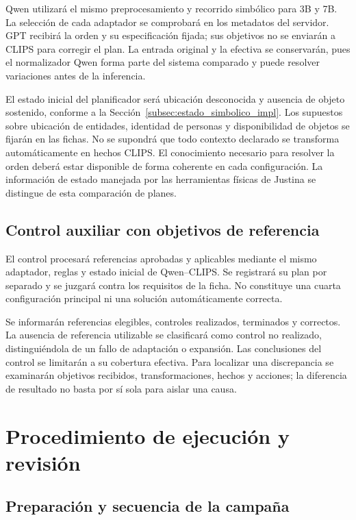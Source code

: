 Qwen utilizará el mismo preprocesamiento y recorrido simbólico para 3B
y 7B. La selección de cada adaptador se comprobará en los metadatos del
servidor. GPT recibirá la orden y su especificación fijada; sus objetivos
no se enviarán a CLIPS para corregir el plan. La entrada original y la
efectiva se conservarán, pues el normalizador Qwen forma parte del
sistema comparado y puede resolver variaciones antes de la inferencia.

El estado inicial del planificador será ubicación desconocida y ausencia
de objeto sostenido, conforme a la
Sección~\ref{subsec:estado_simbolico_impl}. Los supuestos sobre ubicación
de entidades, identidad de personas y disponibilidad de objetos se fijarán
en las fichas. No se supondrá que todo contexto declarado se transforma
automáticamente en hechos CLIPS. El conocimiento necesario para resolver
la orden deberá estar disponible de forma coherente en cada configuración.
La información de estado manejada por las herramientas físicas de Justina
se distingue de esta comparación de planes.

\subsection{Control auxiliar con objetivos de referencia}

El control procesará referencias aprobadas y aplicables mediante el mismo
adaptador, reglas y estado inicial de Qwen--CLIPS. Se registrará su plan
por separado y se juzgará contra los requisitos de la ficha. No constituye
una cuarta configuración principal ni una solución automáticamente correcta.

Se informarán referencias elegibles, controles realizados, terminados y
correctos. La ausencia de referencia utilizable se clasificará como control
no realizado, distinguiéndola de un fallo de adaptación o expansión.
Las conclusiones del control se limitarán a su cobertura efectiva.
Para localizar una discrepancia se examinarán objetivos recibidos,
transformaciones, hechos y acciones; la diferencia de resultado no basta
por sí sola para aislar una causa.

\section{Procedimiento de ejecución y revisión}
\label{subsec:procedimiento_cap6}

\subsection{Preparación y secuencia de la campaña}

